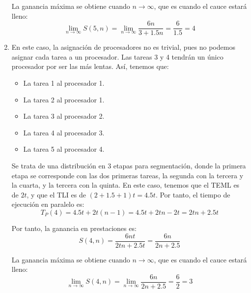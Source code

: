 \begin{ejercicio}
\begin{enumerate}
    La ganancia máxima se obtiene cuando $n\rightarrow\infty$, que es cuando el cauce estará lleno:
    \begin{equation*}
        \lim_{n\to\infty}S(5,n) = \lim_{n\to\infty}\dfrac{6n}{3 + 1.5n} = \dfrac{6}{1.5} = 4
    \end{equation*}

    \item En este caso, la asignación de procesadores no es trivial, pues no podemos asignar cada tarea a un procesador.
    Las tareas 3 y 4 tendrán un único procesador por ser las más lentas. Así, tenemos que:
    \begin{itemize}
        \item La tarea 1 al procesador 1.
        \item La tarea 2 al procesador 1.
        \item La tarea 3 al procesador 2.
        \item La tarea 4 al procesador 3.
        \item La tarea 5 al procesador 4.
    \end{itemize}
    Se trata de una distribución en 3 etapas para segmentación, donde la primera etapa se corresponde con las dos primeras tareas, la segunda con la tercera y la cuarta, y la tercera con la quinta.
    En este caso, tenemos que el TEML es de $2t$, y que el TLI es de $(2+1.5+1)t=4.5t$. Por tanto, el tiempo de ejecución en paralelo es:
    \begin{equation*}
        T_P(4) = 4.5t + 2t(n-1) = 4.5t + 2tn - 2t = 2tn + 2.5t
    \end{equation*}
    
    Por tanto, la ganancia en prestaciones es:
    \begin{equation*}
        S(4,n) = \dfrac{6nt}{2tn + 2.5t} = \dfrac{6n}{2n + 2.5}
    \end{equation*}

    La ganancia máxima se obtiene cuando $n\rightarrow\infty$, que es cuando el cauce estará lleno:
    \begin{equation*}
        \lim_{n\to\infty}S(4,n) = \lim_{n\to\infty}\dfrac{6n}{2n + 2.5} = \dfrac{6}{2} = 3
    \end{equation*}
\end{enumerate}


\end{ejercicio}


